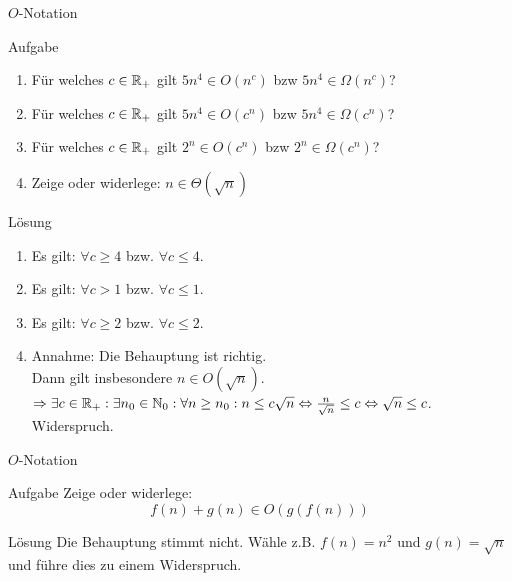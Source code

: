\begin{frame}{$O$-Notation}
	\begin{exampleblock}{Aufgabe}
		\begin{enumerate}
			\item Für welches $c \in \mathbb{R}_+$ gilt $5n^4 \in O(n^c)$ bzw $5n^4 \in \Omega(n^c)$?
			\item Für welches $c \in \mathbb{R}_+$ gilt $5n^4 \in O(c^n)$ bzw $5n^4 \in \Omega(c^n)$?
			\item Für welches $c \in \mathbb{R}_+$ gilt $2^n \in O(c^n)$ bzw $2^n \in \Omega(c^n)$?
			\item Zeige oder widerlege: $n \in \Theta(\sqrt{n})$
		\end{enumerate}
	\end{exampleblock}
\pause
	\begin{block}{Lösung}
		\begin{enumerate}
			\item Es gilt: $\forall c \geq 4$ bzw. $\forall c \leq 4$.
			\item Es gilt: $\forall c > 1$ bzw. $\forall c \leq 1$.
			\item Es gilt: $\forall c \geq 2$ bzw. $\forall c \leq 2$.
			\item \small Annahme: Die Behauptung ist richtig.\\
				Dann gilt insbesondere $n \in O(\sqrt{n})$.\\
				$\Rightarrow \exists c\in \mathbb{R}_+:\exists n_0\in\mathbb{N}_0: \forall n\geq n_0: n \leq c \sqrt{n} \Leftrightarrow \frac{n}{\sqrt{n}} \leq c \Leftrightarrow \sqrt{n} \leq c$. Widerspruch.
				
		\end{enumerate}
	\end{block}
\end{frame}

\begin{frame}{$O$-Notation}
    \begin{exampleblock}{Aufgabe}
    	Zeige oder widerlege:
    	\[
    		f(n) + g(n) \in O(g(f(n)))
    	\]
    \end{exampleblock}
\pause
	\begin{block}{Lösung}
		Die Behauptung stimmt nicht. Wähle z.B. $f(n) = n^2$ und $g(n) = \sqrt{n}$ und führe dies zu einem Widerspruch.
	\end{block}
\end{frame}

